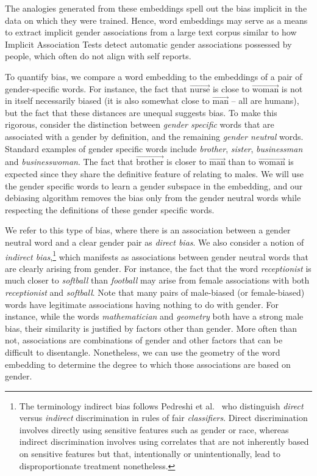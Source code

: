 \documentclass{article}
\newcommand{\wvec}[1]{\overrightarrow{\text{#1}}}
\begin{document}
The analogies generated from these embeddings spell out the bias implicit in the data on which they were trained. Hence, word embeddings may serve as a means to extract implicit gender associations from a large text corpus similar to how Implicit Association Tests \cite{greenwald1998measuring} detect automatic gender associations possessed by people, which often do not align with self reports. 


To quantify bias, we compare a word embedding to the embeddings of a pair of gender-specific words. For instance, the fact that $\wvec{nurse}$ is close to $\wvec{woman}$ is not in itself necessarily biased (it is also somewhat close to $\wvec{man}$ -- all are humans), but the fact that these distances are unequal suggests bias. To make this rigorous, consider the distinction between {\em gender specific} words that are associated with a gender by definition, and the remaining {\em gender neutral} words. Standard examples of gender specific words include \emph{brother}, \emph{sister}, {\em businessman} and {\em businesswoman}. 
The fact that $\wvec{brother}$ is closer to $\wvec{man}$ than to $\wvec{woman}$ is expected since they share the definitive feature of relating to males. We will use the gender specific words to learn a gender subspace in the embedding, and our debiasing algorithm removes the bias only from the gender neutral words while respecting the definitions of these gender specific words. 

We refer to this type of bias, where there is an association between a gender neutral word and a clear gender pair as {\em direct bias}. We also consider a notion of {\em indirect bias},\footnote{The terminology indirect bias follows Pedreshi et al.~\cite{pedreshi2008discrimination} who distinguish {\em direct} versus {\em indirect} discrimination in rules of fair {\em classifiers}. Direct discrimination involves directly using sensitive features such as gender or race, whereas indirect discrimination involves using correlates that are not inherently based on sensitive features but that, intentionally or unintentionally, lead to disproportionate treatment nonetheless.} which manifests as associations between gender neutral words that are clearly arising from gender. For instance, the fact that the word {\em receptionist} is much closer to {\em softball} than {\em football} may arise from female associations with both {\em receptionist} and {\em softball}. Note that many pairs of male-biased (or female-biased) words have legitimate associations having nothing to do with gender. For instance, while the words {\em mathematician} and {\em geometry} both have a strong male bias, their similarity is justified by factors other than gender. More often than not, associations are combinations of gender and other factors that can be difficult to disentangle. Nonetheless, we can use the geometry of the word embedding to determine the degree to which those associations are based on gender. 
\end{document}
